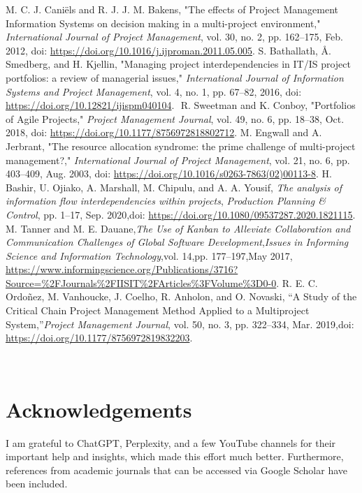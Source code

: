 \documentclass{llncs}
\begin{document}
\begin{thebibliography}{5}
  M. C. J. Caniëls and R. J. J. M. Bakens, "The effects of Project Management Information Systems on decision making in a multi-project environment," \textit{International Journal of Project Management}, vol. 30, no. 2, pp. 162–175, Feb. 2012, doi: \url{https://doi.org/10.1016/j.ijproman.2011.05.005}.
  S. Bathallath, Å. Smedberg, and H. Kjellin, "Managing project interdependencies in IT/IS project portfolios: a review of managerial issues," \textit{International Journal of Information Systems and Project Management}, vol. 4, no. 1, pp. 67–82, 2016, doi: \url{https://doi.org/10.12821/ijispm040104}.
‌
  R. Sweetman and K. Conboy, "Portfolios of Agile Projects," \textit{Project Management Journal}, vol. 49, no. 6, pp. 18–38, Oct. 2018, doi: \url{https://doi.org/10.1177/8756972818802712}.
 M. Engwall and A. Jerbrant, "The resource allocation syndrome: the prime challenge of multi-project management?," \textit{International Journal of Project Management}, vol. 21, no. 6, pp. 403–409, Aug. 2003, doi: \url{https://doi.org/10.1016/s0263-7863(02)00113-8}.
H. Bashir, U. Ojiako, A. Marshall, M. Chipulu, and A. A. Yousif,
\textit{The analysis of information flow interdependencies within projects},
\textit{Production Planning \& Control}, pp. 1–17, Sep. 2020,doi: \url{https://doi.org/10.1080/09537287.2020.1821115}.
 M. Tanner and M. E. Dauane,\textit{The Use of Kanban to Alleviate Collaboration and Communication Challenges of Global Software Development},\textit{Issues in Informing Science and Information Technology},vol. 14,pp. 177–197,May 2017,
\url{https://www.informingscience.org/Publications/3716?Source=%2FJournals%2FIISIT%2FArticles%3FVolume%3D0-0}.
R. E. C. Ordoñez, M. Vanhoucke, J. Coelho, R. Anholon, and O. Novaski,
``A Study of the Critical Chain Project Management Method Applied to a Multiproject System,''\emph{Project Management Journal}, vol. 50, no. 3, pp. 322–334, Mar. 2019,doi: \url{https://doi.org/10.1177/8756972819832203}.

‌
‌
‌
\end{thebibliography}



\section{Acknowledgements}
I am grateful to ChatGPT, Perplexity, and a few YouTube channels for their important help and insights, which made this effort much better. Furthermore, references from academic journals that can be accessed via Google Scholar have been included.
\end{document}
